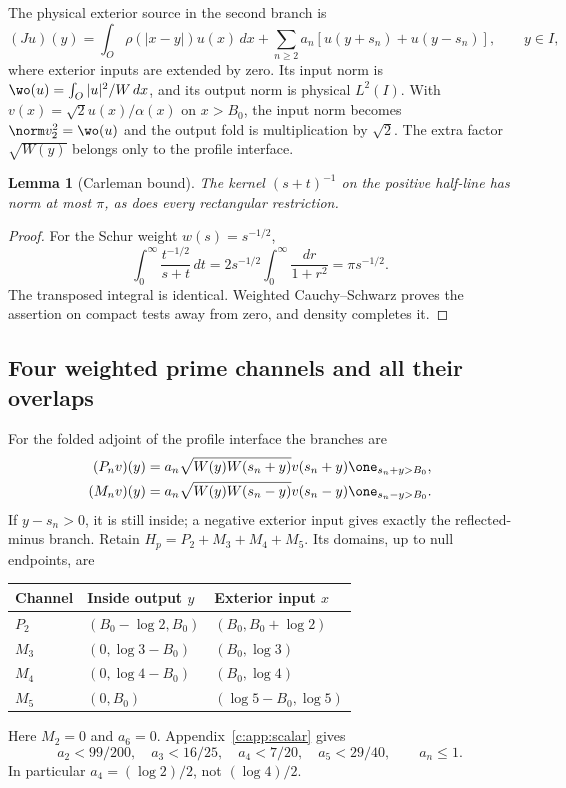 \documentclass[11pt,a4paper]{article}
\numberwithin{equation}{section}
\newtheorem{lemma}[theorem]{Lemma}
\theoremstyle{definition}\newtheorem{definition}[theorem]{Definition}
\theoremstyle{remark}\newtheorem{remark}[theorem]{Remark}
\begin{document}
The physical exterior source in the second branch is
\begin{equation}\label{c:eq:physicalsource}
 (Ju)(y)=\int_O\rho(|x-y|)u(x)\,dx+
 \sum_{n\ge2}a_n[u(y+s_n)+u(y-s_n)],\qquad y\in I,
\end{equation}
where exterior inputs are extended by zero. Its input norm is
$\wo(u)=\int_O|u|^2/W\,dx$, and its output norm is physical $L^2(I)$.
With $v(x)=\sqrt2u(x)/\alpha(x)$ on $x>{B_0}$, the input norm becomes $\norm v_2^2=\wo(u)$ and the output fold is multiplication by $\sqrt2$. The extra factor $\sqrt{W(y)}$ belongs only to the profile interface.

\begin{lemma}[Carleman bound]\label{c:lem:carleman}
The kernel $(s+t)^{-1}$ on the positive half-line has norm at most $\pi$, as does every rectangular restriction.
\end{lemma}
\begin{proof}
For the Schur weight $w(s)=s^{-1/2}$,
\[
 \int_0^\infty\frac{t^{-1/2}}{s+t}\,dt
 =2s^{-1/2}\int_0^\infty\frac{dr}{1+r^2}=\pi s^{-1/2}.
\]
The transposed integral is identical. Weighted Cauchy--Schwarz proves the assertion on compact tests away from zero, and density completes it.
\end{proof}

\subsection{Four weighted prime channels and all their overlaps}\label{c:sec:weightedprime}
For the folded adjoint of the profile interface the branches are
\begin{align*}
 (P_nv)(y)&=a_n\sqrt{W(y)W(s_n+y)}v(s_n+y)\one_{s_n+y>{B_0}},\\
 (M_nv)(y)&=a_n\sqrt{W(y)W(s_n-y)}v(s_n-y)\one_{s_n-y>{B_0}}.
\end{align*}
If $y-s_n>0$, it is still inside; a negative exterior input gives exactly the reflected-minus branch. Retain $H_p=P_2+M_3+M_4+M_5$. Its domains, up to null endpoints, are
\begin{center}\small
\begin{tabular}{@{}lll@{}}\toprule
Channel & Inside output $y$ & Exterior input $x$\\\midrule
$P_2$ & $({B_0}-\log2,{B_0})$ & $({B_0},{B_0}+\log2)$\\
$M_3$ & $(0,\log3-{B_0})$ & $({B_0},\log3)$\\
$M_4$ & $(0,\log4-{B_0})$ & $({B_0},\log4)$\\
$M_5$ & $(0,{B_0})$ & $(\log5-{B_0},\log5)$\\\bottomrule
\end{tabular}
\end{center}
Here $M_2=0$ and $a_6=0$. Appendix~\ref{c:app:scalar} gives
\begin{equation}\label{c:eq:coefficientcaps}
 a_2<99/200,\quad a_3<16/25,\quad a_4<7/20,\quad a_5<29/40,
 \qquad a_n\le1.
\end{equation}
In particular $a_4=(\log2)/2$, not $(\log4)/2$.
\end{document}
